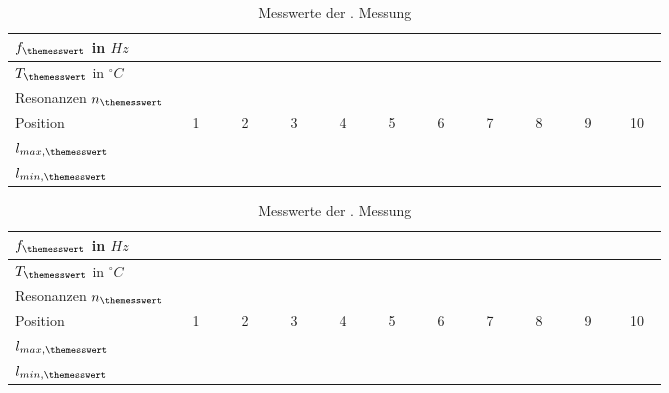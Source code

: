 \begin{table}[h!]
	\label{tab:messprotokoll->messung_3}
	\caption{Messwerte der {\themesswert}. Messung}
	\centering
	\begin{tabular}{|l|c|c|c|c|c|c|c|c|c|c|}
	\hline 
	$f_{\themesswert}$ in $Hz$ & \multicolumn{10}{c|}{~} \\ 
	\hline 
	$T_{\themesswert}$ in $^{\circ}C$ & \multicolumn{10}{c|}{~} \\ 
	\hline 
	Resonanzen $n_{\themesswert}$& \multicolumn{10}{c|}{~} \\ 
	\hline 
	Position & 1 & 2 & 3 & 4 & 5 & 6 & 7 & 8 & 9 & 10 \\ 
	\hline 
	$l_{max,{\themesswert}}$ & ~~~~~ & ~~~~~ & ~~~~~ & ~~~~~ & ~~~~~ & ~~~~~ & ~~~~~ & ~~~~~ & ~~~~~ & ~~~~~ \\ 
	\hline 
	$l_{min,{\themesswert}}$ & ~~~~~ & ~~~~~ & ~~~~~ & ~~~~~ & ~~~~~ & ~~~~~ & ~~~~~ & ~~~~~ & ~~~~~ & ~~~~~ \\
	\hline 
	\end{tabular} 	
\end{table}

\begin{table}[h!]
	\label{tab:messprotokoll->messung_4}
	\caption{Messwerte der {\themesswert}. Messung}
	\centering
	\begin{tabular}{|l|c|c|c|c|c|c|c|c|c|c|}
	\hline 
	$f_{\themesswert}$ in $Hz$ & \multicolumn{10}{c|}{~} \\ 
	\hline 
	$T_{\themesswert}$ in $^{\circ}C$ & \multicolumn{10}{c|}{~} \\ 
	\hline 
	Resonanzen $n_{\themesswert}$& \multicolumn{10}{c|}{~} \\ 
	\hline 
	Position & 1 & 2 & 3 & 4 & 5 & 6 & 7 & 8 & 9 & 10 \\ 
	\hline 
	$l_{max,{\themesswert}}$ & ~~~~~ & ~~~~~ & ~~~~~ & ~~~~~ & ~~~~~ & ~~~~~ & ~~~~~ & ~~~~~ & ~~~~~ & ~~~~~ \\ 
	\hline 
	$l_{min,{\themesswert}}$ & ~~~~~ & ~~~~~ & ~~~~~ & ~~~~~ & ~~~~~ & ~~~~~ & ~~~~~ & ~~~~~ & ~~~~~ & ~~~~~ \\
	\hline 
	\end{tabular} 	
\end{table}
 
\newpage
{}